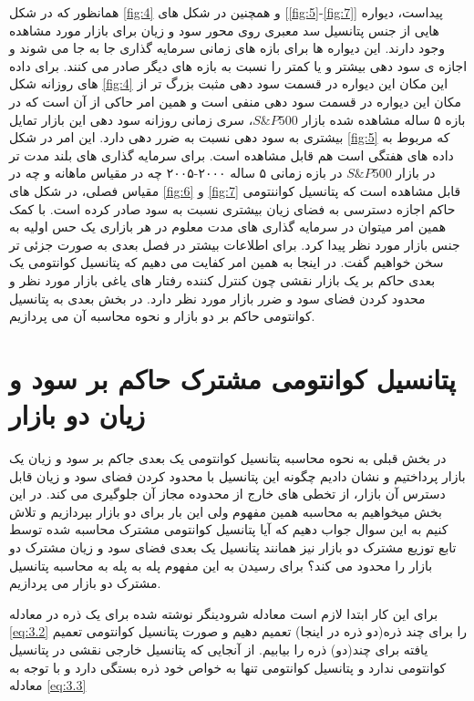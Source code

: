 \documentclass[a4paper,titlepage,12pt,fleqn,oneside]{report}
\begin{document}
همانظور که در شکل 
\ref{fig:4}
و همچنین در شکل های 
[\ref{fig:5}-\ref{fig:7}]
پیداست، دیواره  هایی از جنس پتانسیل سد معبری روی محور سود و زیان برای بازار مورد مشاهده وجود دارند.  این دیواره ها برای بازه های زمانی سرمایه گذاری جا به جا می شوند و اجازه ی سود دهی بیشتر و یا کمتر را نسبت به بازه های دیگر صادر می کنند. برای داده های روزانه شکل
\ref{fig:4}
این مکان این دیواره در قسمت سود دهی مثبت بزرگ تر از مکان این دیواره در قسمت سود دهی منفی است و همین امر حاکی از آن است که در بازه ۵ ساله مشاهده شده بازار
$S\&P500$، 
سری زمانی روزانه سود دهی این بازار تمایل بیشتری به سود دهی نسبت به ضرر دهی دارد. این امر در شکل 
\ref{fig:5}
که مربوط به داده های هفتگی است هم قابل مشاهده است. برای سرمایه گذاری های بلند مدت تر در بازار 
$S\&P500$
در بازه زمانی ۵ ساله ۲۰۰۰-۲۰۰۵ چه در مقیاس ماهانه و چه در مقیاس فصلی، در شکل های 
\ref{fig:6}
و 
\ref{fig:7}
قابل مشاهده است که پتانسیل کواننتومی حاکم اجازه دسترسی به فضای زیان بیشتری نسبت به سود صادر کرده است.
با کمک همین امر میتوان در سرمایه گذاری های مدت معلوم در هر بازاری یک حس اولیه به جنس بازار مورد نظر پیدا کرد. برای اطلاعات بیشتر در فصل بعدی به صورت جزئی تر سخن خواهیم گفت. در اینجا به همین امر کفایت می دهیم که پتانسیل کوانتومی یک بعدی حاکم بر یک بازار نقشی چون کنترل کننده رفتار های یاغی بازار مورد نظر و محدود کردن فضای سود و ضرر بازار مورد نظر دارد. در بخش بعدی به پتانسیل کوانتومی حاکم بر دو بازار و نحوه محاسبه آن می پردازیم.

\section{پتانسیل کوانتومی مشترک حاکم بر سود و زیان دو بازار}
در بخش قبلی به نحوه محاسبه پتانسیل کوانتومی یک بعدی جاکم بر سود و زیان یک بازار پرداختیم و نشان دادیم چگونه این پتانسیل با محدود کردن فضای سود و زیان قابل دسترس آن بازار، از تخطی های خارج از محدوده مجاز آن جلوگیری می کند. در این بخش میخواهیم به محاسبه همین مفهوم ولی این بار برای دو بازار بپردازیم و تلاش کنیم به این سوال جواب دهیم که آیا پتانسیل کوانتومی مشترک محاسبه شده توسط تابع توزیع مشترک دو بازار نیز همانند پتانسیل یک بعدی فضای سود و زیان مشترک دو بازار را محدود می کند؟ برای رسیدن به این مفهوم پله به پله به محاسبه پتانسیل مشترک دو بازار می پردازیم.

 برای این کار ابتدا لازم است معادله شرودینگر نوشته شده برای یک ذره در معادله 
 \ref{eq:3.2}
 را برای چند ذره(دو ذره در اینجا) تعمیم دهیم و صورت پتانسیل کوانتومی تعمیم یافته برای چند(دو) ذره را بیابیم. از آنجایی که پتانسیل خارجی نقشی در پتانسیل کوانتومی ندارد و پتانسیل کوانتومی تنها به خواص خود ذره بستگی دارد و با توجه به معادله 
 \ref{eq:3.3}
 
\end{document}

